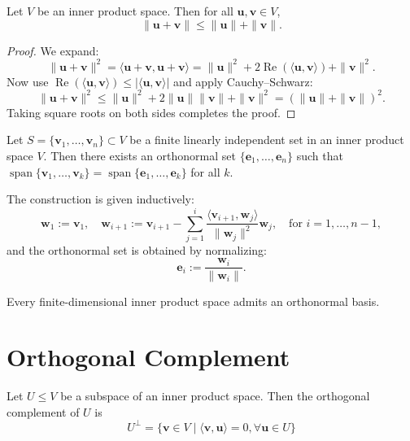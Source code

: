 \begin{proposition}\label{prop:triangle-inequality}
Let \( V \) be an inner product space. Then for all \( \mathbf{u}, \mathbf{v} \in V \),
\[
\| \mathbf{u} + \mathbf{v} \| \leq \| \mathbf{u} \| + \| \mathbf{v} \|.
\]
\end{proposition}

\begin{proof}
We expand:
\[
\| \mathbf{u} + \mathbf{v} \|^2 = \langle \mathbf{u} + \mathbf{v}, \mathbf{u} + \mathbf{v} \rangle = \| \mathbf{u} \|^2 + 2\operatorname{Re}(\langle \mathbf{u}, \mathbf{v} \rangle) + \| \mathbf{v} \|^2.
\]
Now use \( \operatorname{Re}(\langle \mathbf{u}, \mathbf{v} \rangle) \leq | \langle \mathbf{u}, \mathbf{v} \rangle | \) and apply Cauchy–Schwarz:
\[
\| \mathbf{u} + \mathbf{v} \|^2 \leq \| \mathbf{u} \|^2 + 2 \| \mathbf{u} \| \| \mathbf{v} \| + \| \mathbf{v} \|^2 = (\| \mathbf{u} \| + \| \mathbf{v} \|)^2.
\]
Taking square roots on both sides completes the proof.
\end{proof}

\begin{theorem}\label{thm:gram-schmidt}
Let \( S = \{ \mathbf{v}_1, \ldots, \mathbf{v}_n \} \subset V \) be a finite linearly independent set in an inner product space \( V \). Then there exists an orthonormal set \( \{ \mathbf{e}_1, \ldots, \mathbf{e}_n \} \) such that \( \operatorname{span}\{ \mathbf{v}_1, \ldots, \mathbf{v}_k \} = \operatorname{span}\{ \mathbf{e}_1, \ldots, \mathbf{e}_k \} \) for all \( k \).

The construction is given inductively:
\[
\mathbf{w}_1 := \mathbf{v}_1, \quad 
\mathbf{w}_{i+1} := \mathbf{v}_{i+1} - \sum_{j=1}^{i} \frac{\langle \mathbf{v}_{i+1}, \mathbf{w}_j \rangle}{\| \mathbf{w}_j \|^2} \mathbf{w}_j, \quad \text{for } i = 1, \ldots, n-1,
\]
and the orthonormal set is obtained by normalizing:
\[
\mathbf{e}_i := \frac{\mathbf{w}_i}{\| \mathbf{w}_i \|}.
\]
\end{theorem}

\begin{corollary}
Every finite-dimensional inner product space admits an orthonormal basis.
\end{corollary}

\section{Orthogonal Complement}

\begin{definition} Let \(U \leq  V\) be a subspace of an inner product space. Then the orthogonal complement of \(U\) is
\[
{U}^{\perp} = \{ \mathbf{v} \in  V \mid  \langle \mathbf{v},\mathbf{u}\rangle  = 0,\forall \mathbf{u} \in  U\}
\]
\end{definition}

